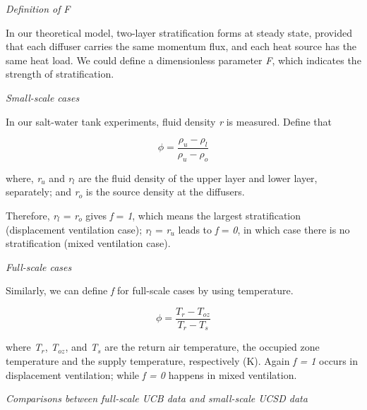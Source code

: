 \emph{Definition of} \emph{F}

In our theoretical model, two-layer stratification forms at steady state, provided that each diffuser carries the same momentum flux, and each heat source has the same heat load. We could define a dimensionless parameter \emph{F}, which indicates the strength of stratification.

\emph{Small-scale cases}

In our salt-water tank experiments, fluid density \emph{r} is measured. Define that

\begin{equation}
\phi  = \frac{{{\rho_u} - {\rho_l}}}{{{\rho_u} - {\rho_o}}}
\end{equation}

where, \emph{r\(_{u}\)} and \emph{r\(_{l}\)} are the fluid density of the upper layer and lower layer, separately; and \emph{r\(_{o}\)} is the source density at the diffusers.

Therefore, \emph{r\(_{l}\)} = \emph{r\(_{o}\)} gives \emph{f} = \emph{1}, which means the largest stratification (displacement ventilation case); \emph{r\(_{l}\)} = \emph{r\(_{u}\)} leads to \emph{f} = \emph{0}, in which case there is no stratification (mixed ventilation case).

\emph{Full-scale cases}

Similarly, we can define \emph{f} for full-scale cases by using temperature.

\begin{equation}
\phi  = \frac{{{T_r} - {T_{oz}}}}{{{T_r} - {T_s}}}
\end{equation}

where \emph{T\(_{r}\)}, \emph{T\(_{oz}\)}, and \emph{T\(_{s}\)} are the return air temperature, the occupied zone temperature and the supply temperature, respectively (K). Again \emph{f = 1} occurs in displacement ventilation; while \emph{f = 0} happens in mixed ventilation.

\emph{Comparisons between full-scale UCB data and small-scale UCSD data}

